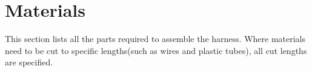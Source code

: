 \documentclass[12pt,letterpaper]{article}
\begin{document}

\newpage
\section{Materials}
This section lists all the parts required to assemble the harness. Where materials need to be cut to specific lengths(such as wires and plastic tubes), all cut lengths are specified.





\end{document}

